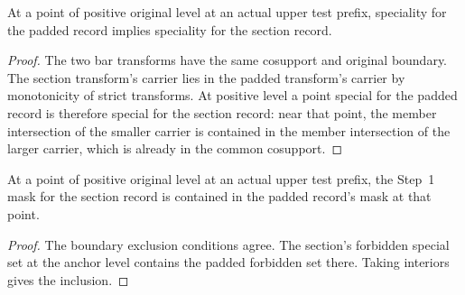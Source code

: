 \begin{lemma}
\label{hir:g1-positive-normal-special-of-padded}
\leanok
At a point of positive original level at an actual upper test prefix,
speciality for the padded record implies speciality for the section
record.
\end{lemma}
\begin{proof}
The two bar transforms have the same cosupport and original boundary.
The section transform's carrier lies in the padded transform's carrier
by monotonicity of strict transforms. At positive level a point special
for the padded record is therefore special for the section record: near
that point, the member intersection of the smaller carrier is contained
in the member intersection of the larger carrier, which is already
in the common cosupport.
\end{proof}

\begin{lemma}
\label{hir:g1-positive-normal-section-mask-subset}
\leanok
At a point of positive original level at an actual upper test prefix,
the Step~1 mask for the section record is contained in the padded
record's mask at that point.
\end{lemma}
\begin{proof}
The boundary exclusion conditions agree. The section's forbidden
special set at the anchor level contains the padded forbidden set
there. Taking interiors gives the inclusion.
\end{proof}

